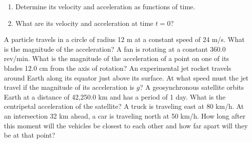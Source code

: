 \documentclass[12pt,addpoints]{exam}
\begin{document}
\begin{center}
\begin{questions}
			\begin{enumerate}[label=(\alph*)]
				\item Determine its velocity and acceleration as functions of time. \vspace{1in}
				\item What are its velocity and acceleration at time $t = 0$?\vspace{1in}
			\end{enumerate}
			\question A particle travels in a circle of radius 12 m at a constant speed of 24 m/s. What is the magnitude of the acceleration?\vspace{1in}
			\question A fan is rotating at a constant 360.0 rev/min. What is the magnitude of the acceleration of a point on one of its blades 12.0 cm from the axis of rotation?\vspace{1in}
			\question An experimental jet rocket travels around Earth along its equator just above its surface. At what speed must the jet travel if the magnitude of its acceleration is $g$?\vspace{1in}
			\question A geosynchronous satellite orbits Earth at a distance of 42,250.0 km and has a period of 1 day. What is the centripetal acceleration of the satellite?\vspace{1in}
			\question A truck is traveling east at 80 km/h. At an intersection 32 km ahead, a car is traveling north at 50 km/h. How long after this moment will the vehicles be closest to each other and how far apart will they be at that point?\vspace{1in}
		\end{questions}	
	\end{center}		
\end{document}

